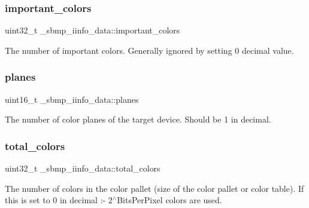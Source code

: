 \subsubsection{\texorpdfstring{important\+\_\+colors}{important\_colors}}
{\footnotesize\ttfamily uint32\+\_\+t \+\_\+sbmp\+\_\+iinfo\+\_\+data\+::important\+\_\+colors}



The number of important colors. Generally ignored by setting \textquotesingle{}0\textquotesingle{} decimal value. 

\mbox{\label{struct__sbmp__iinfo__data_a27b2bede3f33e37d3efd7dd0da350ac0}} 
\subsubsection{\texorpdfstring{planes}{planes}}
{\footnotesize\ttfamily uint16\+\_\+t \+\_\+sbmp\+\_\+iinfo\+\_\+data\+::planes}



The number of color planes of the target device. Should be \textquotesingle{}1\textquotesingle{} in decimal. 

\mbox{\label{struct__sbmp__iinfo__data_ae98e4efd2018a77bec4dc4c052d8b668}} 
\subsubsection{\texorpdfstring{total\+\_\+colors}{total\_colors}}
{\footnotesize\ttfamily uint32\+\_\+t \+\_\+sbmp\+\_\+iinfo\+\_\+data\+::total\+\_\+colors}

The number of colors in the color pallet (size of the color pallet or color table). If this is set to \textquotesingle{}0\textquotesingle{} in decimal \+:-\/ 2$^\wedge$\+Bits\+Per\+Pixel colors are used. \mbox{\label{struct__sbmp__iinfo__data_a83e771acd1d30910dcab7e2410facfcf}} 
